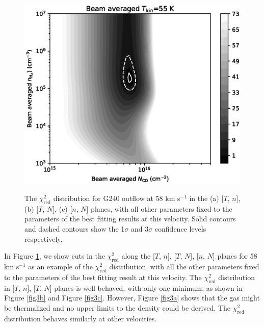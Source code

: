 \begin{figure}[tbp]
{\begin{minipage}[b]{0.5\textwidth}
\includegraphics[width=1\textwidth]{./fig/chiimage_tkin_paper.eps}
\label{fig3c}
\end{minipage}
}
\caption{The $\chi_{\mathrm{red}}^2$ distribution for G240 outflow at 58 km s$^{-1}$ in the (a) [$T$, $n$], (b) [$T$, $N$], (c) [$n$, $N$] planes, with all other parameters fixed to the parameters of the best fitting results at this velocity. Solid contours and dashed contours show the 1$\sigma$ and 3$\sigma$ confidence levels respectively. \label{fig3}}
\end{figure}

In Figure \ref{fig3}, we show cuts in the $\chi_{\mathrm{red}}^2$ along the [$T$, $n$], [$T$, $N$], [$n$, $N$] planes for 58 km s$^{-1}$ as an example of the $\chi_{\mathrm{red}}^2$ distribution, with all the other parameters fixed to  the parameters of the best fitting result at this velocity. The $\chi_{\mathrm{red}}^2$ distribution in [$T$, $n$], [$T$, $N$] planes is well behaved, with only one minimum, as shown in Figure \ref{fig3b} and Figure \ref{fig3c}. However, Figure \ref{fig3a} shows that the gas might be thermalized and no upper limits to the density could be derived. The $\chi_{\mathrm{red}}^2$ distribution behaves similarly at other velocities. 

